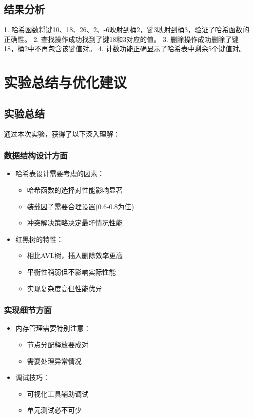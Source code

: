\documentclass[12pt,a4paper]{article}
\begin{document}
\subsection{结果分析}
1. 哈希函数将键10、18、26、2、-6映射到桶2，键3映射到桶3，验证了哈希函数的正确性。
2. 查找操作成功找到了键18和3对应的值。
3. 删除操作成功删除了键18，桶2中不再包含该键值对。
4. 计数功能正确显示了哈希表中剩余5个键值对。

\section{实验总结与优化建议}

\subsection{实验总结}
通过本次实验，获得了以下深入理解：

\subsubsection{数据结构设计方面}
\begin{itemize}
\item 哈希表设计需要考虑的因素：
  \begin{itemize}
  \item 哈希函数的选择对性能影响显著
  \item 装载因子需要合理设置(0.6-0.8为佳)
  \item 冲突解决策略决定最坏情况性能
  \end{itemize}
\item 红黑树的特性：
  \begin{itemize}
  \item 相比AVL树，插入删除效率更高
  \item 平衡性稍弱但不影响实际性能
  \item 实现复杂度高但性能优异
  \end{itemize}
\end{itemize}

\subsubsection{实现细节方面}
\begin{itemize}
\item 内存管理需要特别注意：
  \begin{itemize}
  \item 节点分配释放要成对
  \item 需要处理异常情况
  \end{itemize}
\item 调试技巧：
  \begin{itemize}
  \item 可视化工具辅助调试
  \item 单元测试必不可少
  \end{itemize}
\end{itemize}
\end{document}
